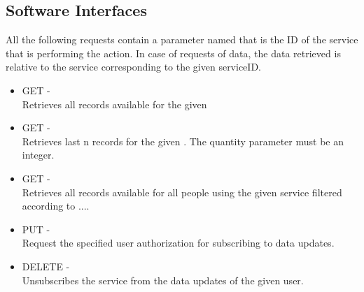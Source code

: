 \documentclass[../../../rasd.tex]{subfiles}
\begin{document}
\subsection{Software Interfaces}
			All the following requests contain a parameter named  that is the ID of the service that is performing the action. In case of requests of data, the data retrieved is relative to the service corresponding to the given serviceID.
			\begin{itemize}
				\item GET -  \\
				Retrieves all records available for the given 
				\item GET -  \\
				Retrieves last n records for the given . The quantity parameter must be an integer.
				\item GET -  \\
				Retrieves all records available for all people using the given service filtered according to ....\\ 
				\item PUT -  \\
				Request the specified user authorization for subscribing to data updates.
				\item DELETE -  \\
				Unsubscribes the service from the data updates of the given user.
			\end{itemize}
\end{document}
